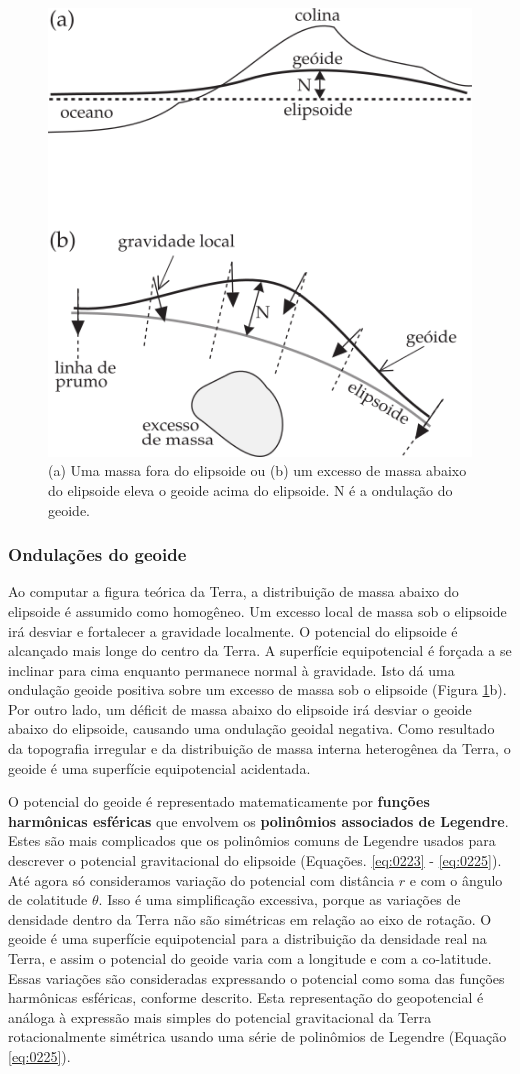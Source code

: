 \documentclass[]{book}
\theoremstyle{definition}
\theoremstyle{definition}
\theoremstyle{definition}
\theoremstyle{remark}
\begin{document}
\begin{figure}

{\centering \includegraphics[width=0.4\linewidth]{fig/Fig_02.25} 

}

\caption{(a) Uma massa fora do elipsoide ou (b) um excesso de massa abaixo do elipsoide eleva o geoide acima do elipsoide. N é a ondulação do geoide. }\label{fig:massa}
\end{figure}

\hypertarget{ondulacoes-do-geoide}{%
\subsubsection{Ondulações do geoide}\label{ondulacoes-do-geoide}}

Ao computar a figura teórica da Terra, a distribuição de massa abaixo do elipsoide é assumido como homogêneo. Um excesso local de massa sob o elipsoide irá desviar e fortalecer a gravidade localmente. O potencial do elipsoide é alcançado mais longe do centro da Terra. A superfície equipotencial é forçada a se inclinar para cima enquanto permanece normal à gravidade. Isto dá uma ondulação geoide positiva sobre um excesso de massa sob o elipsoide (Figura \ref{fig:massa}b). Por outro lado, um déficit de massa abaixo do elipsoide irá desviar o geoide abaixo do elipsoide, causando uma ondulação geoidal negativa. Como resultado da topografia irregular e da distribuição de massa interna heterogênea da Terra, o geoide é uma superfície equipotencial acidentada.

O potencial do geoide é representado matematicamente por \textbf{funções harmônicas esféricas} que envolvem os \textbf{polinômios associados de Legendre}. Estes são mais complicados que os polinômios comuns de Legendre usados para descrever o potencial gravitacional do elipsoide (Equações. \eqref{eq:0223} - \eqref{eq:0225}). Até agora só consideramos variação do potencial com distância \(r\) e com o ângulo de colatitude \(\theta\). Isso é uma simplificação excessiva, porque as variações de densidade dentro da Terra não são simétricas em relação ao eixo de rotação. O geoide é uma superfície equipotencial para a distribuição da densidade real na Terra, e assim o potencial do geoide varia com a longitude e com a co-latitude. Essas variações são consideradas expressando o potencial como soma das funções harmônicas esféricas, conforme descrito. Esta representação do geopotencial é análoga à expressão mais simples do potencial gravitacional da Terra rotacionalmente simétrica usando uma série de polinômios de Legendre (Equação \eqref{eq:0225}).
\end{document}
